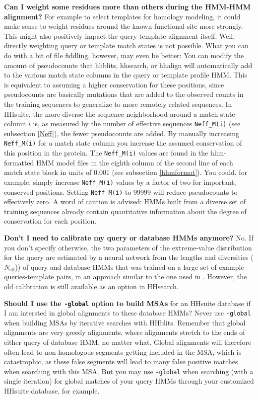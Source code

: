 \documentclass[11pt,a4paper]{article}
\begin{document}
{\bf Can I weight some residues more than others during the HMM-HMM alignment?} For example to select templates for homology modeling, it could make sense to weight residues around the known functional site more strongly. This might also positively impact the query-template alignment itself. Well, directly weighting query or template match states is not possible. What you can do with a bit of file fiddling, however, may even be better: You can modify the amount of pseudocounts that hhblits, hhsearch, or hhalign will automatically add to the various match state columns in the query or template profile HMM. This is equivalent to assuming a higher conservation for these positions, since pseudocounts are basically mutations that are added to the observed counts in the training sequences to generalize to more remotely related sequences. In HHsuite, the more diverse the sequence neighborhood around a match state column $i$ is, as measured by the number of effective sequences \verb`Neff_M(i)` (see subsection \ref{Neff}), the fewer pseudocounts are added. By manually increasing \verb`Neff_M(i)` for a match state column you increase the assumed conservation of this position in the protein. The \verb`Neff_M(i)` values are found in the hhm-formatted HMM model files in the eighth column of the second line of each match state block in units of $0.001$ (see subsection \ref{hhmformat}). You could, for example, simply increase \verb`Neff_M(i)` values by a factor of two for important, conserved positions. Setting \verb`Neff_M(i)` to 99999 will reduce pseudocounts to effectively zero. A word of caution is advised: HMMs built from a diverse set of training sequences already contain quantitative information about the degree of conservation for each position.


{\bf Don't I need to calibrate my query or database HMMs anymore?}
No. If you don't specify otherwise, the two parameters of the extreme-value distribution for the query are estimated by a neural network from the lengths and diversities ($N_\mathrm{eff}$)) of query and database HMMs that was trained on a large set of example queries-template pairs, in an approach similar to the one used in \cite{Sadreyev:2008}. However, the old calibration is still available as an option in HHsearch.

{\bf Should I use the \verb`-global` option to build MSAs} for an HHsuite database if I am intersted in global alignments to these database HMMs?
Never use \verb`-global` when building MSAs by iterative searches with HHblits. Remember that global alignments are very greedy alignments, where alignments stretch to the ends of either query of database HMM, no matter what. Global alignments will therefore often lead to non-homologous segments getting included in the MSA, which is catastrophic, as these false segments will lead to many false positive matches when searching with this MSA. But you may use \verb`-global` when searching (with a single iteration) for global matches of your query HMMs through your customized HHsuite database, for example.
\end{document}
